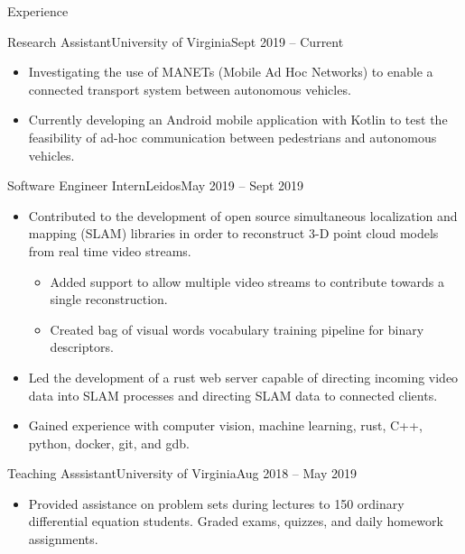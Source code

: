\documentclass[]{mcdowellcv}
\begin{document}
\begin{cvsection}{Experience}
    \begin{cvsubsection}{Research Assistant}{University of Virginia}{Sept 2019 -- Current}
        \begin{itemize}%
            \item Investigating the use of MANETs (Mobile Ad Hoc Networks) to enable a connected transport system between autonomous vehicles.
            \item Currently developing an Android mobile application with Kotlin to test the feasibility of ad-hoc communication between pedestrians and autonomous vehicles.
        \end{itemize}
    \end{cvsubsection}

    \begin{cvsubsection}{Software Engineer Intern}{Leidos}{May 2019 -- Sept 2019}
        \begin{itemize}%
            \item Contributed to the development of open source simultaneous localization and mapping (SLAM) libraries in order to reconstruct 3-D point cloud models from real time video streams.
                \begin{itemize}
                    \item Added support to allow multiple video streams to contribute towards a single reconstruction.
                    \item Created bag of visual words vocabulary training pipeline for binary descriptors.
                \end{itemize}

            \item Led the development of a rust web server capable of directing incoming video data into SLAM processes and directing SLAM data to connected clients.
            \item Gained experience with computer vision, machine learning, rust, C++, python, docker, git, and gdb.
        \end{itemize}
    \end{cvsubsection}
    \begin{cvsubsection}{Teaching Asssistant}{University of Virginia}{Aug 2018 -- May 2019}

        \begin{itemize}%
            \item Provided assistance on problem sets during lectures to 150 ordinary differential equation students.  Graded exams, quizzes, and daily homework assignments.
        \end{itemize}
    \end{cvsubsection}
\end{cvsection}
\end{document}
